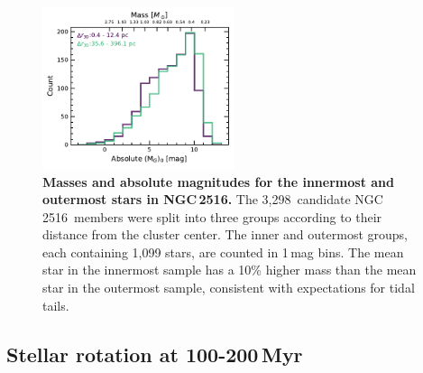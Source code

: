 \documentclass[12pt,twocolumn,tighten]{aastex63}
\newcommand{\cn}{NGC\,2516} %
\newcommand{\nkinematic}{3{,}298} %
\begin{document}
\begin{figure}[t]
	\begin{center}
		\leavevmode
		\includegraphics[width=0.5\textwidth]{f9.pdf}
	\end{center}
	\vspace{-0.7cm}
  \caption{ {\bf Masses and absolute magnitudes for the innermost and
  outermost stars in \cn.} The \nkinematic\ candidate \cn\ members
  were split into three groups according to their distance from the
  cluster center.  The inner and outermost groups, each containing
  1,099 stars, are counted in 1\,mag bins.  The mean star in the
  innermost sample has a 10\% higher mass than the mean star in the
  outermost sample, consistent with expectations for tidal tails.
  \label{fig:massfunction}
	}
\end{figure}



\subsection{Stellar rotation at 100-200\,Myr}
\label{disc:rotn}
\end{document}
